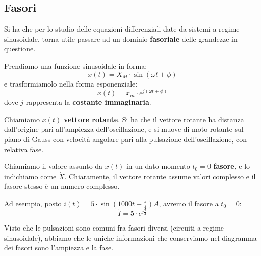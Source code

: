 \documentclass[a4paper,11pt]{article}
\begin{document}
\subsection{Fasori}
Si ha che per lo studio delle equazioni differenziali date da sistemi a regime sinusoidale, torna utile passare ad un dominio \textbf{fasoriale} delle grandezze in questione.

Prendiamo una funzione sinusoidale in forma:
$$
x(t) = X_M \cdot \sin (\omega t + \phi)
$$
e trasformiamolo nella forma esponenziale:
$$
x(t) = x_m \cdot e^{j(\omega t + \phi)}
$$
dove $j$ rappresenta la \textbf{costante immaginaria}.

Chiamiamo $x(t)$ \textbf{vettore rotante}.
Si ha che il vettore rotante ha distanza dall'origine pari all'ampiezza dell'oscillazione, e si muove di moto rotante sul piano di Gauss con velocità angolare pari alla pulsazione dell'oscillazione, con relativa fase.

Chiamiamo il valore assunto da $x(t)$ in un dato momento $t_0 = 0$ \textbf{fasore}, e lo indichiamo come $\dot{X}$.
Chiaramente, il vettore rotante assume valori complesso e il fasore stesso è un numero complesso.

Ad esempio, posto $i(t) = 5 \cdot \sin (1000 t + \frac{\pi}{4})A$, avremo il fasore a $t_0 = 0$:
$$
\dot{I} = 5 \cdot e^{j \frac{\pi}{4}}
$$

Visto che le pulsazioni sono comuni fra fasori diversi (circuiti a regime sinusoidale), abbiamo che le uniche informazioni che conserviamo nel diagramma dei fasori sono l'ampiezza e la fase.
\end{document}
